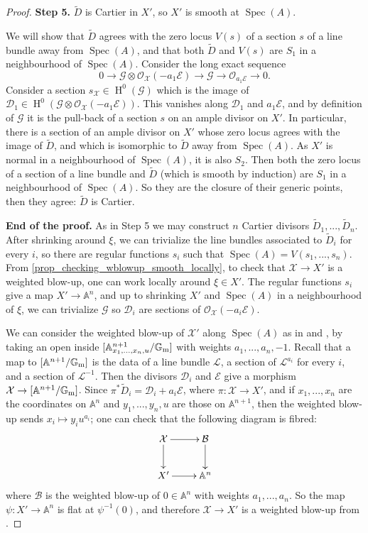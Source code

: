 \documentclass{amsart}
\newcommand{\bA}{\mathbb{A}}
\newcommand{\bG}{\mathbb{G}}
\newcommand{\oH}{\operatorname{H}}
\newcommand{\cB}{\mathcal{B}}
\newcommand{\cD}{\mathcal{D}}
\newcommand{\cE}{\mathcal{E}}
\newcommand{\cG}{\mathcal{G}}
\newcommand{\cL}{\mathcal{L}}
\newcommand{\cO}{\mathcal{O}}
\newcommand{\cX}{\mathcal{X}}
\newcommand{\spec}{\operatorname{Spec}}
\newcommand{\Gm}{\bG_{{\rm m}}}
\theoremstyle{definition}
\begin{document}
\begin{proof}
\textbf{Step 5.} $\widetilde{D}$ is Cartier in $X'$, so $X'$ is smooth at $\spec(A)$.

We will show that $\widetilde{D}$ agrees with the zero locus $V(s)$ of a section $s$ of a line bundle away from $\spec(A)$, and that both $\widetilde{D}$ and $V(s)$ are $S_1$ in a neighbourhood of $\spec(A)$. Consider the long exact sequence
$$0 \to \cG\otimes \cO_{\cX}(-a_1\cE) \to \cG \to \cO_{a_1\cE}\to 0.$$
Consider a section $s_\cX\in\oH^0(\cG)$ which is the image of
$\cD_1\in \oH^0(\cG\otimes \cO_{\cX}(-a_1\cE))$. This vanishes along $\cD_1$ and $a_1\cE$, and by definition of $\cG$ it is the pull-back of a section $s$ on an ample divisor on $X'$.
In particular, there is a section of an ample divisor on $X'$ whose zero locus agrees with the image of $\widetilde{D}$, and which is isomorphic to $\widetilde{D}$ away from $\spec(A)$. As $X'$ is normal in a neighbourhood of $\spec(A)$, it is also $S_2$. Then both the zero locus of a section of a line bundle and $\widetilde{D}$ (which is smooth by induction) are $S_1$ in a neighbourhood of $\spec(A)$. So they are the closure of their generic points, then they agree: $\widetilde{D}$ is Cartier.

\textbf{End of the proof.}
As in Step 5 we may construct $n$ Cartier divisors $\widetilde{D}_1,...,\widetilde{D}_n$. After shrinking around $\xi$, we can trivialize the line bundles associated to $\widetilde{D}_i$ for every $i$, so there are regular functions $s_i$ such that $\spec(A)=V(s_1,...,s_n)$.
From \cref{prop_checking_wblowup_smooth_locally}, to check that $\cX\to X'$ is a weighted blow-up, one can work locally around $\xi\in X'$. The regular functions $s_i$ give a map $X'\to \bA^n$, and up to shrinking $X'$ and $\spec(A)$ in a neighbourhood of $\xi$, we can trivialize $\cG$ so $\cD_i$ are sections of $\cO_{\cX}(-a_i\cE)$.

We can consider the weighted blow-up of $\cX'$ along $\spec(A)$ as in \cite[Sec. 2]{Inc} and , by taking an open inside $[\bA^{n+1}_{x_1,...,x_n,u}/\Gm]$ with weights $a_1,...,a_n,-1$. Recall that a map to $[\bA^{n+1}/\Gm]$ is the data of a line bundle $\cL$, a section of $\cL^{a_i}$ for every $i$, and a section of $\cL^{-1}$. Then the divisors $\cD_i$ and $\cE$ give a morphism $\cX\to [\bA^{n+1}/\Gm]$. Since $\pi^*\widetilde{D}_i = \cD_i + a_i\cE$, where $\pi:\cX\to X'$, and if $x_1,...,x_n$ are the coordinates on $\bA^{n}$ and $y_1,...,y_n,u$ are those on $\bA^{n+1}$, then the weighted blow-up sends $x_i\mapsto y_iu^{a_i}$; one can check that the following diagram is fibred:
$$\xymatrix{\cX\ar[d] \ar[r] & \cB\ar[d] \\ X'\ar[r] & \bA^n}$$
where $\cB$ is the weighted blow-up of $0\in \bA^n$ with weights ${a_1,...,a_n}$. 
So the map $\psi:X'\to \bA^n$ is flat at $\psi^{-1}(0)$, and therefore $\cX\to X'$ is a weighted blow-up from .
\end{proof}
\end{document}
